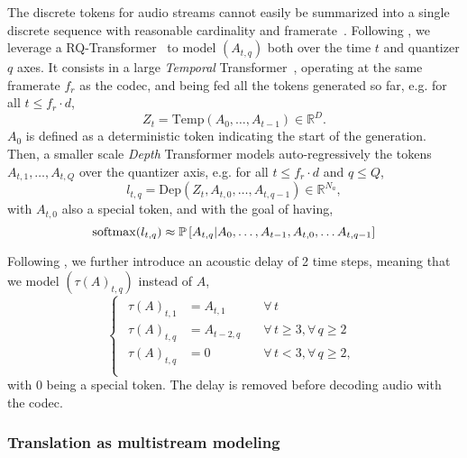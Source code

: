 The discrete tokens for audio streams cannot easily be summarized into a single discrete sequence with reasonable cardinality and framerate~\citep{musicgen}. Following \citet{uniaudio,moshi}, we leverage a RQ-Transformer~\citep{rq-transformer} 
to model $(A_{t, q})$ both over the time $t$ and quantizer $q$ axes.
It consists in a large \emph{Temporal} Transformer~\citep{attentionvaswani}, operating at the same framerate $f_r$ as the codec, and being fed all the tokens generated so far, e.g.
for all $t \leq f_r \cdot d$, 
 \begin{equation}
 \label{eq:temp_transformer}
Z_t = \mathrm{Temp}(A_0, \ldots, A_{t - 1}) \in \mathbb{R}^{D}.
\end{equation}
$A_0$ is defined as a deterministic token indicating the start of the generation.
Then, a smaller scale \emph{Depth} Transformer models auto-regressively
the tokens $A_{t, 1}, \ldots, A_{t, Q}$ over the quantizer axis, e.g. for all $t \leq f_r \cdot d$ and $q \leq Q$,
\begin{equation}
\label{eq:dep_transformer}
    l_{t, q} = \mathrm{Dep}(Z_t, A_{t, 0}, \ldots, A_{t, q - 1}) \in \mathbb{R}^{N_a},
\end{equation}
with $A_{t, 0}$ also a special token, and with the goal of having,
\begin{equation*}
    \mathrm{softmax}(l_{t, q}) \approx \mathbb{P}\left[A_{t, q} | A_{0}, \ldots, A_{t-1}, A_{t, 0}, \ldots A_{t, q - 1}\right]
\end{equation*}

Following \citep{musicgen,moshi}, we further introduce an acoustic delay of 2 time steps, meaning that we model $(\tau(A)_{t, q})$ instead of $A$,
\begin{equation}
\begin{cases}
\begin{array}{lll}
    \tau(A)_{t, 1} &= A_{t, 1} &\quad\forall\, t \\
    \tau(A)_{t, q} &= A_{t - 2, q} &\quad\forall\, t \geq 3, \forall\, q \geq 2\\
    \tau(A)_{t, q} &= 0 &\quad\forall\, t < 3, \forall\, q \geq 2, \\
\end{array}
\end{cases}
\end{equation}
with 0 being a special token. The delay is removed before decoding audio with
the codec.

\subsubsection{Translation as multistream modeling}
\label{sec:multistream}

